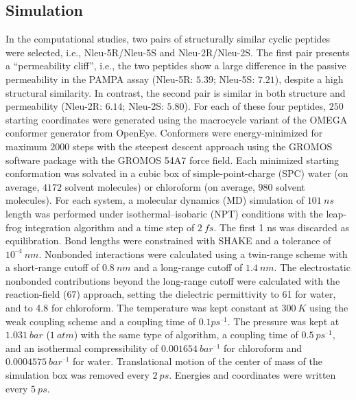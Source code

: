 \subsection{Simulation}
In the computational studies, two pairs of structurally similar cyclic peptides were selected, i.e., Nleu-5R/Nleu-5S and Nleu-2R/Nleu-2S. 
The first pair presents a “permeability cliff”, i.e., the two peptides show a large difference in the passive permeability in the PAMPA assay (Nleu-5R: $5.39$; Nleu-5S: $7.21$), despite a high structural similarity. 
In contrast, the second pair is similar in both structure and permeability (Nleu-2R: $6.14$; Nleu-2S: $5.80$). 
For each of these four peptides, $250$ starting coordinates were generated using the macrocycle variant of the OMEGA conformer generator from OpenEye. \cite{Hawkins2012, Hawkins2010, Poongavanam2018}
Conformers were energy-minimized for maximum $2000$ steps with the steepest descent \cite{Ruder2016} approach using the GROMOS software package \cite{Schmid2012} with the GROMOS 54A7 force field. \cite{Schmid2011} 
Each minimized starting conformation was solvated in a cubic box of simple-point-charge (SPC) water \cite{Berendsen1981} (on average, $4172$ solvent molecules) or chloroform \cite{Tironi1994} (on average, $980$ solvent molecules). 
For each system, a molecular dynamics (MD) simulation of $101~ns$ length was performed under isothermal–isobaric (NPT) conditions with the leap-frog integration algorithm \cite{Hockney1970, Gunsteren1988} and a time step of $2~fs$. 
The first 1 ns was discarded as equilibration. Bond lengths were constrained with SHAKE \cite{Ryckaert1977} and a tolerance of $10^{–4}~nm$. 
Nonbonded interactions were calculated using a twin-range scheme with a short-range cutoff of $0.8~nm$ and a long-range cutoff of $1.4~nm$. 
The electrostatic nonbonded contributions beyond the long-range cutoff were calculated with the reaction-field \cite{Tironi1995} (67) approach, setting the dielectric permittivity to 61 \cite{Heinz2001} for water, and to 4.8 \cite{Tironi1994} for chloroform. 
The temperature was kept constant at $300~K$ using the weak coupling scheme \cite{Berendsen1984} and a coupling time of $0.1 ps^{–1}$. 
The pressure was kept at $1.031~bar$ ($1~atm$) with the same type of algorithm, a coupling time of $0.5~ps^{–1}$, and an isothermal compressibility of $0.001654~bar^{–1}$ for chloroform and $0.0004575~bar^{–1}$ for water. 
Translational motion of the center of mass of the simulation box was removed every $2~ps$. Energies and coordinates were written every $5~ps$.

